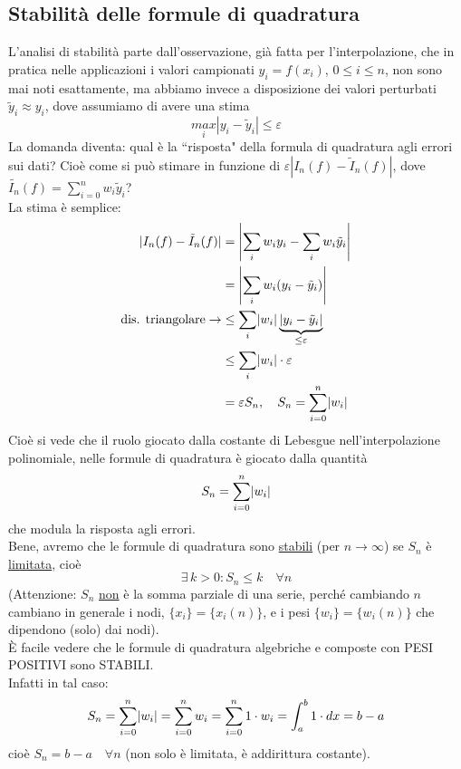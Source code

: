 \documentclass[12pt,a4paper]{article}
\DeclarePairedDelimiter{\abs}{\lvert}{\rvert}
\begin{document}
\subsection{Stabilità delle formule di quadratura}
L'analisi di stabilità parte dall'osservazione, già fatta per l'interpolazione, che in pratica
nelle applicazioni i valori campionati $y_i=f(x_i)$, $0\leq i\leq n$, non sono mai noti esattamente, ma abbiamo invece a disposizione dei valori perturbati $\tilde{y}_i\approx y_i$, dove assumiamo di avere una stima 
\begin{equation*}
    \underset{i}{max}|y_i-\tilde{y}_i|\leq \varepsilon
\end{equation*}
La domanda diventa: qual è la ``risposta" della formula di quadratura agli errori sui dati? Cioè come si può stimare in funzione di $\varepsilon|I_n(f)-\tilde{I}_n(f)|$, dove $\tilde{I_n}(f)=\sum_{i=0}^nw_i\tilde{y}_i$?\\
La stima è semplice:
\[\begin{split}
    \abs{I_n(f) - \Tilde{I}_n(f)} & = \abs*{\sum_i w_i y_i - \sum_i w_i \Tilde{y}_i} \\
    & = \abs*{\sum_i w_i( y_i - \Tilde{y}_i)} \\
    \text{dis. triangolare} \to & \le \sum_i \abs*{w_i} \underbrace{\abs*{y_i - \Tilde{y}_i}}_{\le \varepsilon} \\
    & \le \sum_i \abs*{w_i} \cdot \varepsilon \\
    & = \varepsilon S_n, \quad S_n = \sum_{i=0}^n \abs*{w_i}
\end{split}\]
Cioè si vede che il ruolo giocato dalla costante di Lebesgue nell'interpolazione polinomiale, nelle formule di quadratura è giocato dalla quantità
\[S_n = \sum_{i=0}^n \abs*{w_i}\]
che modula la risposta agli errori.\\
Bene, avremo che le formule di quadratura sono \uline{stabili} (per $n \to \infty$) se $S_n$ è \uline{limitata}, cioè
\[\exists\, k > 0 : S_n \le k \quad \forall n\]
(Attenzione: $S_n$ \uline{non} è la somma parziale di una serie, perché cambiando $n$ cambiano in generale i nodi, $\{x_i\} = \{x_i(n)\}$, e i pesi $\{w_i\} = \{w_i(n)\}$ che dipendono (solo) dai nodi). \\
È facile vedere che le formule di quadratura algebriche e composte con PESI POSITIVI sono STABILI.\\
Infatti in tal caso:
\[S_n = \sum_{i=0}^n \abs*{w_i} = \sum_{i=0}^n w_i = \sum_{i=0}^n 1 \cdot w_i = \int_a^b 1 \cdot dx = b - a\]
cioè $S_n = b-a \quad \forall n$ (non solo è limitata, è addirittura costante).\\
\end{document}
